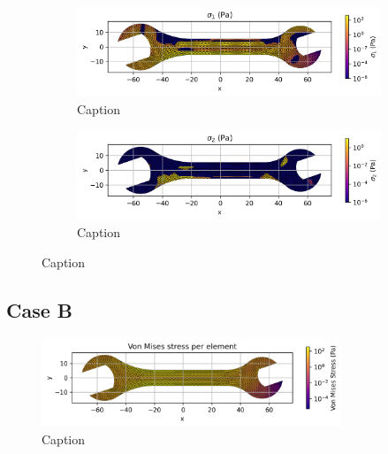   \begin{figure}[H]
    \centering
    \begin{subfigure}[t]{0.49\textwidth}
      \centering
      \includegraphics[width=\textwidth]{GRAFICOS/Case a - sigma_1_per_element.png}
      \caption{Caption}
      \label{fig:deformada_reacciones}
    \end{subfigure}
    \hfill
    \begin{subfigure}[t]{0.49\textwidth}
      \centering
      \includegraphics[width=\textwidth]{GRAFICOS/Case a - sigma_2_per_element.png}
      \caption{Caption}
      \label{fig:von_mises}
    \end{subfigure}
    \caption{Caption}
    \label{fig:analisis_estructural}
  \end{figure}

\subsection{Case B}

\begin{figure}[H]
    \centering
    \includegraphics[width=0.8\textwidth]{GRAFICOS/Case b_von_mises_per_element.png}
    \caption{Caption}
    \label{fig:strain}
  \end{figure}

